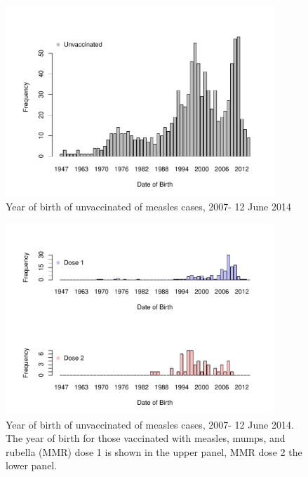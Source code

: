 \documentclass{article}
\begin{document}
\begin{figure}
\begin{center}
     \includegraphics[width=0.9\textwidth]{dob_vacc_unvac.pdf}
\end{center}
\caption{Year of birth of unvaccinated of measles cases, 2007- 12 June 2014}
\label{fig:yearandvac}
\end{figure}

\begin{figure}
\begin{center}
     \includegraphics[width=0.9\textwidth]{dob_vacc_dose.pdf}
\end{center}
\caption{Year of birth of unvaccinated of measles cases, 2007- 12 June 2014. The year of birth for those vaccinated with measles, mumps, and rubella (MMR) dose 1 is shown in the upper panel, MMR dose 2 the lower panel.}
\label{fig:yearandvacf}
\end{figure}
\end{document}

